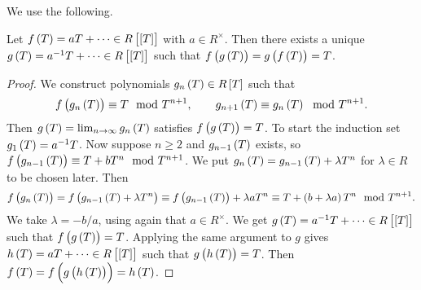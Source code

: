 
We use the following.

\begin{lemma}
\label{lem:8.4}
Let $ f\br{T} = aT + \dots \in R\sbr{\sbr{T}} $ with $ a \in R^\times $. Then there exists a unique $ g\br{T} = a^{-1}T + \dots \in R\sbr{\sbr{T}} $ such that $ f\br{g\br{T}} = g\br{f\br{T}} = T $.
\end{lemma}

\begin{proof}
We construct polynomials $ g_n\br{T} \in R\sbr{T} $ such that
$$ f\br{g_n\br{T}} \equiv T \mod T^{n + 1}, \qquad g_{n + 1}\br{T} \equiv g_n\br{T} \mod T^{n + 1}. $$
Then $ g\br{T} = \lim_{n \to \infty} g_n\br{T} $ satisfies $ f\br{g\br{T}} = T $. To start the induction set $ g_1\br{T} = a^{-1}T $. Now suppose $ n \ge 2 $ and $ g_{n - 1}\br{T} $ exists, so $ f\br{g_{n - 1}\br{T}} \equiv T + bT^n \mod T^{n + 1} $. We put $ g_n\br{T} = g_{n - 1}\br{T} + \lambda T^n $ for $ \lambda \in R $ to be chosen later. Then
$$ f\br{g_n\br{T}} = f\br{g_{n - 1}\br{T} + \lambda T^n} \equiv f\br{g_{n - 1}\br{T}} + \lambda aT^n \equiv T + \br{b + \lambda a}T^n \mod T^{n + 1}. $$
We take $ \lambda = -b / a $, using again that $ a \in R^\times $. We get $ g\br{T} = a^{-1}T + \dots \in R\sbr{\sbr{T}} $ such that $ f\br{g\br{T}} = T $. Applying the same argument to $ g $ gives $ h\br{T} = aT + \dots \in R\sbr{\sbr{T}} $ such that $ g\br{h\br{T}} = T $. Then $ f\br{T} = f\br{g\br{h\br{T}}} = h\br{T} $.
\end{proof}

\pagebreak

